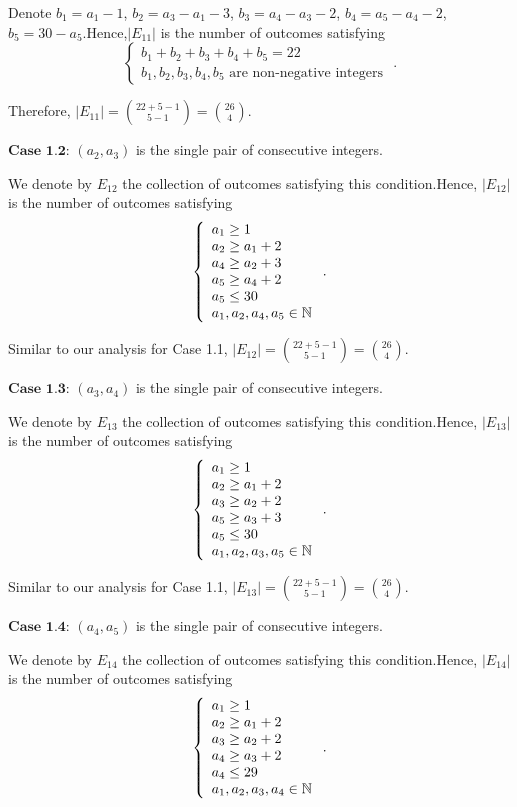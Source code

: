 \begin{enumerate}
 Denote $b_1 = a_1 - 1$, $b_2 = a_3 - a_1 - 3$, $b_3 = a_4 - a_3 - 2$, $b_4 = a_5 - a_4 - 2$, $b_5 = 30 - a_5$.Hence,$| E_{11} |$ is the number of outcomes satisfying
 \[ \left\{ \begin{array}{l} b_1 + b_2 + b_3 + b_4 + b_5 = 22 \\ b_1, b_2 , b_3, b_4, b_5 \mbox{ are non-negative integers } \end{array} \right.. \]

 Therefore, $| E_{11} | = \binom{22 + 5 - 1}{5 - 1} = \binom{26}{4}$.

 $\textbf{Case 1.2}$: $\left( a_2 , a_3 \right)$ is the single pair of consecutive integers.

 We denote by $E_{12}$ the collection of outcomes satisfying this condition.Hence, $| E_{12} |$ is the number of outcomes satisfying
 \[ \left\{ \begin{array}{l} a_1 \geq 1 \\ a_2 \geq a_1 + 2 \\ a_4 \geq a_2 + 3 \\ a_5 \geq a_4 + 2 \\ a_5 \leq 30 \\ a_1, a_2, a_4, a_5 \in \Bbb N \end{array} \right.. \]

 Similar to our analysis for Case 1.1,  $| E_{12} | = \binom{22 + 5 - 1}{5 - 1} = \binom{26}{4}$.

 $\textbf{Case 1.3}$: $\left( a_3 , a_4 \right)$ is the single pair of consecutive integers.

 We denote by $E_{13}$ the collection of outcomes satisfying this condition.Hence, $| E_{13} |$ is the number of outcomes satisfying
 \[ \left\{ \begin{array}{l} a_1 \geq 1 \\ a_2 \geq a_1 + 2 \\ a_3 \geq a_2 + 2 \\ a_5 \geq a_3 + 3 \\ a_5 \leq 30 \\ a_1, a_2, a_3, a_5 \in \Bbb N \end{array} \right.. \]

 Similar to our analysis for Case 1.1,  $| E_{13} | = \binom{22 + 5 - 1}{5 - 1} = \binom{26}{4}$.

 $\textbf{Case 1.4}$: $\left( a_4 , a_5 \right)$ is the single pair of consecutive integers.

 We denote by $E_{14}$ the collection of outcomes satisfying this condition.Hence, $| E_{14} |$ is the number of outcomes satisfying
 \[ \left\{ \begin{array}{l} a_1 \geq 1 \\ a_2 \geq a_1 + 2 \\ a_3 \geq a_2 + 2 \\ a_4 \geq a_3 + 2 \\ a_4 \leq 29 \\ a_1, a_2, a_3, a_4 \in \Bbb N \end{array} \right.. \]


\end{enumerate}
